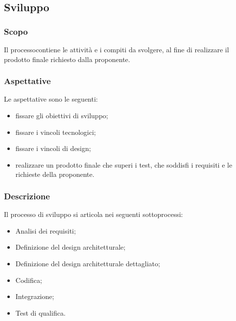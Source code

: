 		\begin{comment} 
		\textbf{(questa ultima sezione è da inserire nella fase successiva)}
		\subsubsection{Collaudo e consegna del prodotto}
		Al fine di consegnare il prodotto terminato il gruppo deve effettuare un collaudo in presenza del proponente e dei committenti. Precedentemente a questo test il gruppo deve assicurare correttezza, completezza e affidabilità per ogni parte del materiale consegnato, permettendo così che tutti i requisiti obbligatori siano soddisfatti e l'esecuzione dei test abbiano un esito positivo. In seguito al collaudo finale il responsabile di progetto consegna il prodotto su un supporto fisico.
		\end{comment}  
     
\subsection{Sviluppo}
	\subsubsection{Scopo}
	Il processo\glosp contiene le attività e i compiti da svolgere, al fine di realizzare il prodotto finale richiesto dalla proponente.
	\subsubsection{Aspettative}
	Le aspettative sono le seguenti:
	\begin{itemize}
		\item fissare gli obiettivi di sviluppo;
		\item fissare i vincoli tecnologici;
		\item fissare i vincoli di design;
		\item realizzare un prodotto finale che superi i test, che soddisfi i requisiti e le richieste della proponente.
	\end{itemize}
	\subsubsection{Descrizione}
	Il processo di sviluppo si articola nei seguenti sottoprocessi:
	\begin{itemize}
		\item Analisi dei requisiti;
		\item Definizione del design architetturale;
		\item Definizione del design architetturale dettagliato;
		\item Codifica;
		\item Integrazione;
		\item Test di qualifica.
	\end{itemize}
